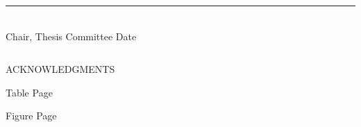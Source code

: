 \documentclass[12pt,oneside]{sfsuthesis}
\theoremstyle{plain} %
\theoremstyle{definition}  %
\theoremstyle{remark}  %
\begin{document}
\vspace{.6in} 

\hrule{\hspace{3.75in}} \\[-10pt]
Chair, Thesis Committee 
\hspace{2.5in}
Date

\newpage
\[ \]
\vspace{-1.8in}
\begin{center}{ACKNOWLEDGMENTS}\end{center}

\vspace{.3in}
\begin{quote}
\noindent

\end{quote}

\renewcommand{\contentsname}{\vspace{-1.8in} \begin{center} \normalsize \rm TABLE OF CONTENTS \end{center}}
\renewcommand{\listfigurename}{\vspace{-1.8in} \begin{center} \normalsize \rm LIST OF FIGURES \end{center}}
\renewcommand{\listtablename}{\vspace{-1.8in} \begin{center} \normalsize \rm LIST OF TABLES \end{center}}
\renewcommand{\cftchapfont}{\normalfont}
\renewcommand{\cftchappagefont}{\normalfont}
\renewcommand{\cftchapleader}{\cftdotfill{\cftdotsep}} %
\renewcommand{\cftsecfont}{\normalfont}
\renewcommand{\cftsecpagefont}{\normalfont}
\renewcommand{\cftsecleader}{\cftdotfill{\cftdotsep}}

\newpage \tableofcontents 
\newpage Table \hfill Page \listoftables %
\newpage Figure \hfill Page \listoffigures %

\newpage
\pagestyle{myheadings}
\setcounter{page}{1}
\end{document}
